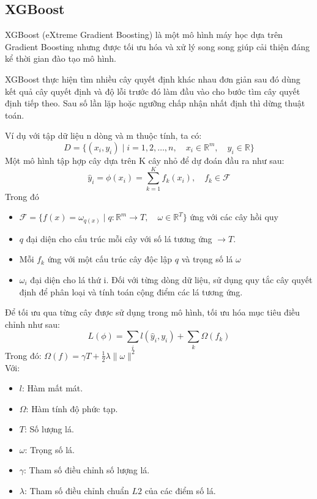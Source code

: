 \documentclass[conference]{IEEEtran}
\begin{document}
\subsection{XGBoost}
XGBoost (eXtreme Gradient Boosting) là một mô hình máy học dựa trên  Gradient Boosting nhưng được tối ưu hóa và xử lý song song giúp cải thiện đáng kể thời gian đào tạo mô hình. \cite{XGBoost}

XGBoost thực hiện tìm nhiều cây quyết định khác nhau đơn giản sau đó dùng kết quả cây quyết định và độ lỗi trước đó làm đầu vào cho bước tìm cây quyết định tiếp theo. Sau số lần lặp hoặc ngưỡng chấp nhận nhất định thì dừng thuật toán. \cite{XGBoost}

Ví dụ với tập dữ liệu n dòng và m thuộc tính, ta có:
\[
D = \{(x_i, y_i) \mid i = 1, 2, \ldots, n, \quad x_i \in \mathbb{R}^m, \quad y_i \in \mathbb{R}\}
\]
Một mô hình tập hợp cây dựa trên K cây nhỏ để dự đoán đầu ra như sau:
\[
\hat{y}_i = \phi(x_i) = \sum_{k=1}^{K} f_k(x_i), \quad f_k \in \mathcal{F}
\]
Trong đó
\begin{itemize}
    \item \(\mathcal{F} = \{ f(x) = \omega_{q(x)} \mid q: \mathbb{R}^m \rightarrow T, \quad \omega \in \mathbb{R}^T \}\) ứng với các cây hồi quy
    \item \(q\) đại diện cho cấu trúc mỗi cây với số lá tương ứng \(\rightarrow T\). 
    \item Mỗi \(f_k\) ứng với một cấu trúc cây độc lập \(q\) và trọng số lá \(\omega\)
    \item \(\omega_i\) đại diện cho lá thứ i. Đối với từng dòng dữ liệu, sử dụng quy tắc cây quyết định để phân loại và tính toán cộng điểm các lá tương ứng.
\end{itemize}
Để tối ưu qua từng cây được sử dụng trong mô hình, tối ưu hóa mục tiêu điều chỉnh như sau:
\[
L(\phi) = \sum_{i} l(\hat{y}_i, y_i) + \sum_{k} \Omega(f_k)
\]
Trong đó: \(\Omega(f) = \gamma T + \frac{1}{2} \lambda \|\omega\|^2\) \\
Với: 
\begin{itemize}
    \item \( l \): Hàm mất mát.
    \item \( \Omega \): Hàm tính độ phức tạp.
    \item \( T \): Số lượng lá.
    \item \( \omega \): Trọng số lá.
    \item \( \gamma \): Tham số điều chỉnh số lượng lá.
    \item \( \lambda \): Tham số điều chỉnh chuẩn \( L2 \) của các điểm số lá.
\end{itemize}
\end{document}

